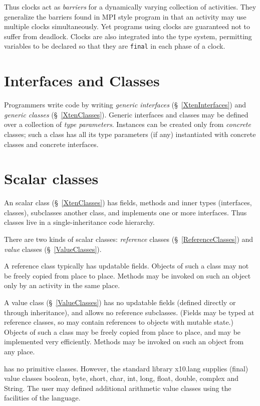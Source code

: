 Thus clocks act as {\em barriers} for a dynamically varying collection
of activities. They generalize the barriers found in MPI style program
in that an activity may use multiple clocks simultaneously. Yet
programs using clocks are guaranteed not to suffer from
deadlock. Clocks are also integrated into the \Xten{} type system,
permitting variables to be declared so that they are {\tt final} in each
phase of a clock.

\section{Interfaces and Classes}
Programmers write \Xten{} code by writing {\em generic interfaces}
(\S~\ref{XtenInterfaces}) and {\em generic classes}
(\S~\ref{XtenClasses}). Generic interfaces and classes may be
defined over a collection of {\em type parameters}. Instances can be
created only from {\em concrete} classes; such a class has all its
type parameters (if any) instantiated with concrete classes and
concrete interfaces.

\section{Scalar classes}
An \Xten{} scalar class (\S~\ref{XtenClasses}) has fields, methods and
inner types (interfaces, classes), subclasses another class, and
implements one or more interfaces. Thus \Xten{} classes live in a
single-inheritance code hierarchy.  

There are two kinds of scalar classes: {\em reference} classes
(\S~\ref{ReferenceClasses}) and {\em value} classes
(\S~\ref{ValueClasses}).

A reference class typically has updatable fields. Objects of such a
class may not be freely copied from place to place. Methods may be
invoked on such an object only by an activity in the same place.

A value class (\S~\ref{ValueClasses}) has no updatable fields (defined
directly or through inheritance), and allows no reference
subclasses. (Fields may be typed at reference classes, so may contain
references to objects with mutable state.) Objects of such a class may
be freely copied from place to place, and may be implemented very
efficiently. Methods may be invoked on such an object from any place.

\Xten{} has no primitive classes. However, the standard library {\cf
x10.lang} supplies (final) value classes {\cf boolean}, {\cf byte},
{\cf short}, {\cf char}, {\cf int}, {\cf long}, {\cf float}, {\cf
double}, {\cf complex} and {\cf String}. The user may defined
additional arithmetic value classes using the facilities of the
language.

